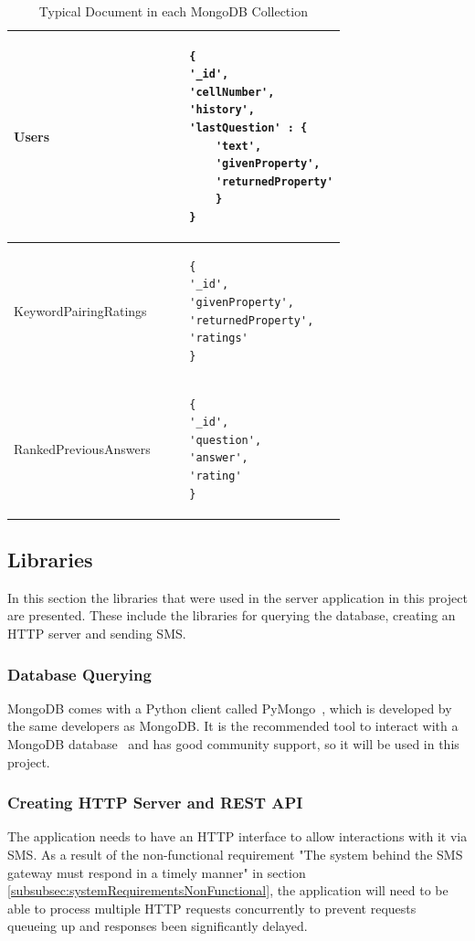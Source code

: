 \documentclass[authoryearcitations]{UoYCSproject}
\begin{document}
\begin{table}
\begin{center}
    \begin{tabular}{| l | l |}
    \hline
    
    Users &
    \begin{lstlisting}
    {
    '_id',
    'cellNumber',
    'history',
    'lastQuestion' : {
        'text',
        'givenProperty',
        'returnedProperty'
        }
    }
    \end{lstlisting}
    \\ \hline
    
    KeywordPairingRatings &
    \begin{lstlisting}
    {
    '_id',
    'givenProperty',
    'returnedProperty',
    'ratings'
    }
    \end{lstlisting}
    \\ \hline
    
    RankedPreviousAnswers &
    \begin{lstlisting}
    {
    '_id',
    'question',
    'answer',
    'rating'
    }
    \end{lstlisting}
    \\ \hline
    
    \end{tabular}
    \caption{Typical Document in each MongoDB Collection}
    \label{table:collectionStructure}
\end{center}
\end{table}

\subsection{Libraries}
In this section the libraries that were used in the server application in this project are presented. These include the libraries for querying the database, creating an HTTP server and sending SMS.

\subsubsection{Database Querying}
MongoDB comes with a Python client called PyMongo~\cite{libraryPyMongo}, which is developed by the same developers as MongoDB.  It is the recommended tool to interact with a MongoDB database~\cite{pyMongoDoc} and has good community support, so it will be used in this project.

\subsubsection{Creating HTTP Server and REST API}
The application needs to have an HTTP interface to allow interactions with it via SMS.  As a result of the non-functional requirement "The system behind the SMS gateway must respond in a timely manner" in section \ref{subsubsec:systemRequirementsNonFunctional}, the application will need to be able to process multiple HTTP requests concurrently to prevent requests queueing up and responses been significantly delayed.
\end{document}
